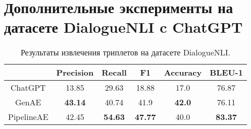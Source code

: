 \newpage
\section{Дополнительные эксперименты на датасете DialogueNLI c ChatGPT} \label{AppendixB}

\begin{table}[!ht]
\centering
\begin{tabular}{c c c c c c}
    & Precision & Recall & F1 & Accuracy & BLEU-1 \\
    \hline
    \hline
    ChatGPT & 13.85 & 29.63 & 18.88 & 17.0 & 76.87 \\
    \hline
    GenAE & \textbf{43.14} & 40.74 & 41.9 & \textbf{42.0} & 76.11  \\
    \hline
    PipelineAE & 42.45 & \textbf{54.63} & \textbf{47.77} & 40.0 & \textbf{83.37} \\
    \hline
\end{tabular}
\caption{Результаты извлечения триплетов на датасете DialogueNLI.}
\label{table:chatgpt_results}
\end{table}
